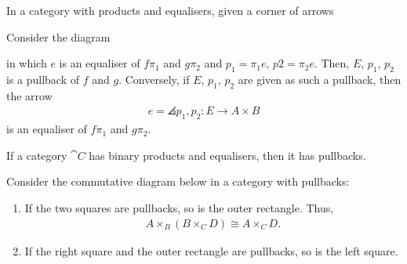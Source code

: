 \documentclass{article}
\begin{document}
\begin{proposition}[Awodey p. 93]
	In a category with products and equalisers, given a corner of arrows
	\begin{center}
	\end{center}
	Consider the diagram
	\begin{center}
	\end{center}
	in which $e$ is an equaliser of $f\pi_1$ and $g\pi_2$ and $p_1=\pi_1 e$, $p2=\pi_2 e$. Then,
	$E$, $p_1$, $p_2$ is a pullback of $f$ and $g$. Conversely, if $E$, $p_1$, $p_2$ are given as
	such a pullback, then the arrow
	\begin{align*}
		e=\angles{p_1,p_2}:E\to A\times B
	\end{align*}
	is an equaliser of $f\pi_1$ and $g\pi_2$.
\end{proposition}

\begin{corollary}[Awodey p. 94]
	If a category $\cat C$ has binary products and equalisers, then it has pullbacks.
\end{corollary}

\begin{lemma}[Awodey p. 95]
	Consider the commutative diagram below in a category with pullbacks:
	\begin{center}
	\end{center}
	\begin{enumerate}
		\item If the two squares are pullbacks, so is the outer rectangle. Thus, \begin{align*}
			      A\times_B (B\times_C D) \cong A\times_C D.
		      \end{align*}
		\item If the right square and the outer rectangle are pullbacks, so is the left square.
	\end{enumerate}
\end{lemma}
\end{document}
